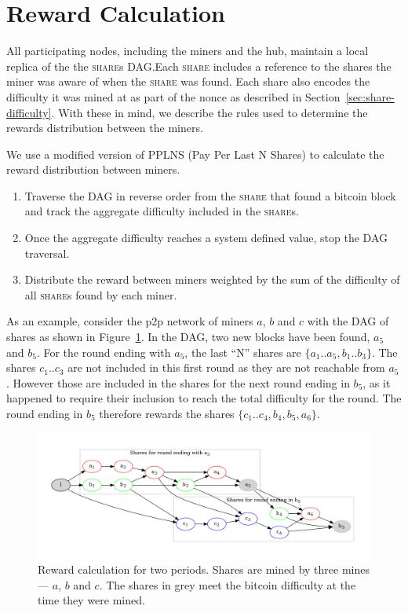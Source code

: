 \documentclass{article}
\begin{document}
\section{Reward Calculation}\label{sec:rewards}

All participating nodes, including the miners and the hub, maintain a
local replica of the the \textsc{share}s DAG.\@ Each \textsc{share}
includes a reference to the shares the miner was aware of when the
\textsc{share} was found. Each share also encodes the difficulty it
was mined at as part of the nonce as described in
Section~\ref{sec:share-difficulty}. With these in mind, we describe
the rules used to determine the rewards distribution between the
miners.

We use a modified version of PPLNS (Pay Per Last N Shares) to
calculate the reward distribution between miners.

\begin{enumerate}
\item Traverse the DAG in reverse order from the \textsc{share} that
  found a bitcoin block and track the aggregate difficulty included in
  the \textsc{share}s.
\item Once the aggregate difficulty reaches a system defined value,
  stop the DAG traversal.
\item Distribute the reward between miners weighted by the sum of the
  difficulty of all \textsc{share}s found by each miner.
\end{enumerate}

As an example, consider the p2p network of miners $a$, $b$ and $c$
with the DAG of shares as shown in
Figure~\ref{fig:reward-calculation}. In the DAG, two new blocks have
been found, $a_5$ and $b_5$. For the round ending with $a_5$, the last
``N'' shares are $\{a_1..a_5, b_1..b_3\}$. The shares $c_1..c_3$ are
not included in this first round as they are not reachable from
$a_5$. However those are included in the shares for the next round
ending in $b_5$, as it happened to require their inclusion to reach
the total difficulty for the round. The round ending in $b_5$
therefore rewards the shares $\{c_1..c_4, b_4, b_5, a_6\}$.

\begin{figure}
  \begin{center}
    \includegraphics[width=1.0\textwidth]{reward-calculation}
    \caption{Reward calculation for two periods. Shares are mined by
      three mines --- $a$, $b$ and $c$. The shares in grey meet the
      bitcoin difficulty at the time they were
      mined.}\label{fig:reward-calculation}
  \end{center}
\end{figure}
\end{document}
